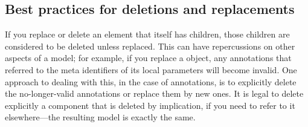 \subsection{Best practices for deletions and replacements}
\label{best-practices-deletions}
\label{best-practices-replacements}

If you replace or delete an element that itself has children, those children are considered to be deleted unless replaced.  This can have repercussions on other aspects of a model; for example, if you replace a \KineticLaw object, any annotations that referred to the meta identifiers of its local parameters will become invalid.  One approach to dealing with this, in the case of annotations, is to explicitly delete the no-longer-valid annotations or replace them by new ones.  It is legal to delete explicitly a component that is deleted by implication, if you need to refer to it elsewhere---the resulting model is exactly the same.






